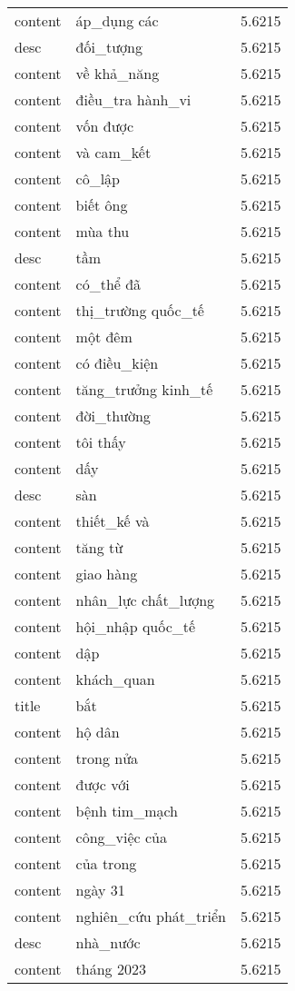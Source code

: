 \documentclass{article}
\begin{document}
\begin{tabular}{lll}
content & áp\_dụng các & 5.6215\\
desc & đối\_tượng & 5.6215\\
content & về khả\_năng & 5.6215\\
content & điều\_tra hành\_vi & 5.6215\\
content & vốn được & 5.6215\\
content & và cam\_kết & 5.6215\\
content & cô\_lập & 5.6215\\
content & biết ông & 5.6215\\
content & mùa thu & 5.6215\\
desc & tầm & 5.6215\\
content & có\_thể đã & 5.6215\\
content & thị\_trường quốc\_tế & 5.6215\\
content & một đêm & 5.6215\\
content & có điều\_kiện & 5.6215\\
content & tăng\_trưởng kinh\_tế & 5.6215\\
content & đời\_thường & 5.6215\\
content & tôi thấy & 5.6215\\
content & dấy & 5.6215\\
desc & sàn & 5.6215\\
content & thiết\_kế và & 5.6215\\
content & tăng từ & 5.6215\\
content & giao hàng & 5.6215\\
content & nhân\_lực chất\_lượng & 5.6215\\
content & hội\_nhập quốc\_tế & 5.6215\\
content & dập & 5.6215\\
content & khách\_quan & 5.6215\\
title & bắt & 5.6215\\
content & hộ dân & 5.6215\\
content & trong nửa & 5.6215\\
content & được với & 5.6215\\
content & bệnh tim\_mạch & 5.6215\\
content & công\_việc của & 5.6215\\
content & của trong & 5.6215\\
content & ngày 31 & 5.6215\\
content & nghiên\_cứu phát\_triển & 5.6215\\
desc & nhà\_nước & 5.6215\\
content & tháng 2023 & 5.6215\\

\end{tabular}
\end{document}
